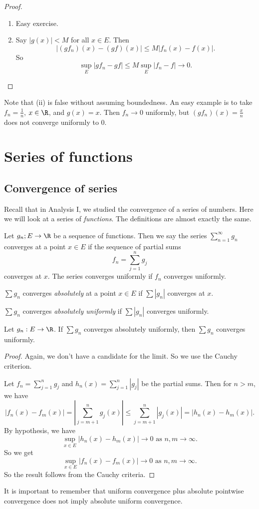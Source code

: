 \documentclass[a4paper]{article}
\begin{document}
\begin{proof}\leavevmode
  \begin{enumerate}
    \item Easy exercise.
    \item Say $|g(x)| < M$ for all $x\in E$. Then
    \[
      |(gf_n)(x) - (gf)(x)| \leq M |f_n(x) - f(x)|.
    \]
    So
    \[
      \sup_E |gf_n - gf| \leq M \sup_E |f_n - f| \to 0.
    \]
  \end{enumerate}
\end{proof}
Note that (ii) is false without assuming boundedness. An easy example is to take $f_n = \frac{1}{n}$, $x\in \R$, and $g(x) = x$. Then $f_n \to 0$ uniformly, but $(gf_n)(x) = \frac{x}{n}$ does not converge uniformly to $0$.

\section{Series of functions}
\subsection{Convergence of series}
Recall that in Analysis I, we studied the convergence of a series of numbers. Here we will look at a series of \emph{functions}. The definitions are almost exactly the same.
\begin{defi}
  Let $g_n; E \to \R$ be a sequence of functions. Then we say the series $\sum_{n = 1}^\infty g_n$ converges at a point $x \in E$ if the sequence of partial sums
  \[
    f_n = \sum_{j = 1}^ng_j
  \]
  converges at $x$. The series converges uniformly if $f_n$ converges uniformly.
\end{defi}

\begin{defi}
  $\sum g_n$ converges \emph{absolutely} at a point $x\in E$ if $\sum |g_n|$ converges at $x$.

  $\sum g_n$ converges \emph{absolutely uniformly} if $\sum |g_n|$ converges uniformly.
\end{defi}

\begin{prop}
  Let $g_n: E\to \R$. If $\sum g_n$ converges absolutely uniformly, then $\sum g_n$ converges uniformly.
\end{prop}

\begin{proof}
  Again, we don't have a candidate for the limit. So we use the Cauchy criterion.

  Let $f_n = \sum\limits_{j = 1}^n g_j$ and $h_n(x) = \sum\limits_{j = 1}^n |g_j|$ be the partial sums. Then for $n > m$, we have
  \[
    |f_n(x) - f_m(x)| = \left|\sum_{j = m + 1}^n g_j(x)\right| \leq \sum_{j = m + 1}^n |g_j(x)| = |h_n(x) - h_m(x)|.
  \]
  By hypothesis, we have
  \[
    \sup_{x\in E}|h_n(x) - h_m(x)| \to 0\text{ as }n, m\to \infty.
  \]
  So we get
  \[
    \sup_{x\in E}|f_n(x) - f_m(x)| \to 0\text{ as }n, m\to \infty.
  \]
  So the result follows from the Cauchy criteria.
\end{proof}
It is important to remember that uniform convergence plus absolute pointwise convergence does not imply absolute uniform convergence.
\end{document}
